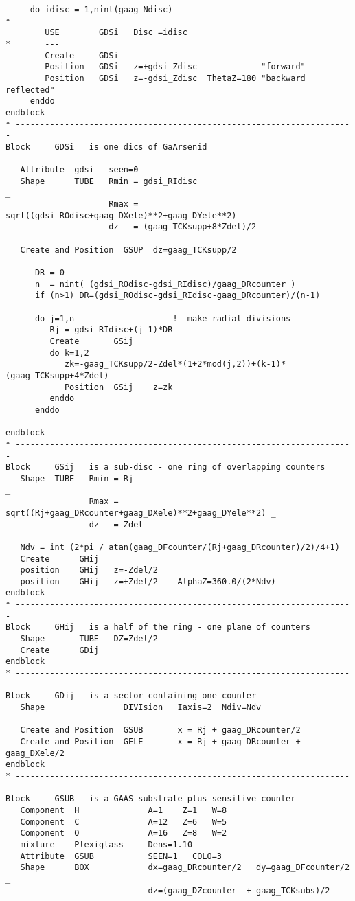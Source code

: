 \begin{verbatim}
     do idisc = 1,nint(gaag_Ndisc)
*
        USE        GDSi   Disc =idisc
*       ---
        Create     GDSi
        Position   GDSi   z=+gdsi_Zdisc             "forward"
        Position   GDSi   z=-gdsi_Zdisc  ThetaZ=180 "backward reflected"
     enddo
endblock
* ---------------------------------------------------------------------
Block     GDSi   is one dics of GaArsenid

   Attribute  gdsi   seen=0
   Shape      TUBE   Rmin = gdsi_RIdisc                                     _
                     Rmax = sqrt((gdsi_ROdisc+gaag_DXele)**2+gaag_DYele**2) _
                     dz   = (gaag_TCKsupp+8*Zdel)/2
 
   Create and Position  GSUP  dz=gaag_TCKsupp/2
 
      DR = 0
      n  = nint( (gdsi_ROdisc-gdsi_RIdisc)/gaag_DRcounter )
      if (n>1) DR=(gdsi_ROdisc-gdsi_RIdisc-gaag_DRcounter)/(n-1)

      do j=1,n                    !  make radial divisions
         Rj = gdsi_RIdisc+(j-1)*DR      
         Create       GSij
         do k=1,2
            zk=-gaag_TCKsupp/2-Zdel*(1+2*mod(j,2))+(k-1)*(gaag_TCKsupp+4*Zdel)
            Position  GSij    z=zk
         enddo
      enddo

endblock
* ---------------------------------------------------------------------
Block     GSij   is a sub-disc - one ring of overlapping counters
   Shape  TUBE   Rmin = Rj                                                    _
                 Rmax = sqrt((Rj+gaag_DRcounter+gaag_DXele)**2+gaag_DYele**2) _
                 dz   = Zdel

   Ndv = int (2*pi / atan(gaag_DFcounter/(Rj+gaag_DRcounter)/2)/4+1)
   Create      GHij
   position    GHij   z=-Zdel/2
   position    GHij   z=+Zdel/2    AlphaZ=360.0/(2*Ndv)
endblock
* ---------------------------------------------------------------------
Block     GHij   is a half of the ring - one plane of counters
   Shape       TUBE   DZ=Zdel/2
   Create      GDij
endblock
* ---------------------------------------------------------------------
Block     GDij   is a sector containing one counter
   Shape                DIVIsion   Iaxis=2  Ndiv=Ndv

   Create and Position  GSUB       x = Rj + gaag_DRcounter/2
   Create and Position  GELE       x = Rj + gaag_DRcounter + gaag_DXele/2
endblock
* ---------------------------------------------------------------------
Block     GSUB   is a GAAS substrate plus sensitive counter
   Component  H              A=1    Z=1   W=8
   Component  C              A=12   Z=6   W=5
   Component  O              A=16   Z=8   W=2
   mixture    Plexiglass     Dens=1.10
   Attribute  GSUB           SEEN=1   COLO=3
   Shape      BOX            dx=gaag_DRcounter/2   dy=gaag_DFcounter/2  _
                             dz=(gaag_DZcounter  + gaag_TCKsubs)/2


\end{verbatim}
